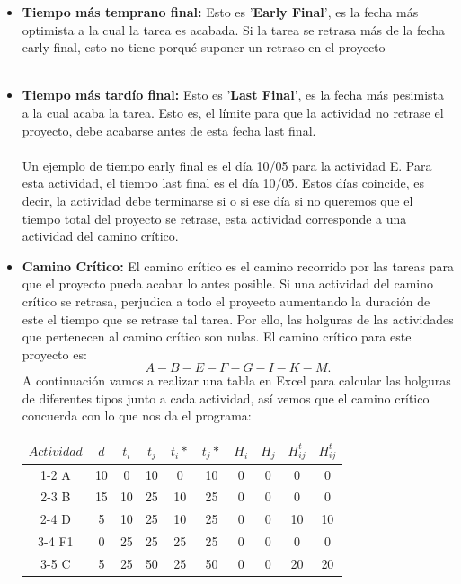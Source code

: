 \documentclass[11pt,letterpaper,onecolumn]{article}
\begin{document}
\begin{itemize}
    \item{\textbf{Tiempo más temprano final:}} Esto es '\textbf{Early Final}', es la fecha más optimista a la cual la tarea es acabada. Si la tarea se retrasa más de la fecha early final, esto no tiene porqué suponer un retraso en el proyecto\\
\\
    \item{\textbf{Tiempo más tardío final:}} Esto es '\textbf{Last Final}', es la fecha más pesimista a la cual acaba la tarea. Esto es, el límite para que la actividad no retrase el proyecto, debe acabarse antes de esta fecha last final. \\
\\
Un ejemplo de tiempo early final es el día 10/05 para la actividad E. Para esta actividad, el tiempo last final es el día 10/05. Estos días coincide, es decir, la actividad debe terminarse si o si ese día si no queremos que el tiempo total del proyecto se retrase, esta actividad corresponde a una actividad del camino crítico.
\\
\item{\textbf{Camino Crítico:}} El camino crítico es el camino recorrido por las tareas para que el proyecto pueda acabar lo antes posible. Si una actividad del camino crítico se retrasa, perjudica a todo el proyecto aumentando la duración de este el tiempo que se retrase tal tarea. Por ello, las holguras de las actividades que pertenecen al camino crítico son nulas. El camino crítico para este proyecto es:
    \[
    A-B-E-F-G-I-K-M
    .\] 
A continuación vamos a realizar una tabla en Excel para calcular las holguras de diferentes tipos junto a cada actividad, así vemos que el camino crítico concuerda con lo que nos da el programa:
\begin{table}[htbp]
    \centering
    \begin{tabular}{|c|ccccccccc|}
        \hline
        $Actividad$ & $d$ & $t_i$ & $t_j$ & $t_i*$ & $t_j*$ & $H_i$ & $H_j$ & $H^t_{ij}$ & $H_{ij}^t$ \\ \hline
        1-2 A & 10 & 0 & 10 & 0 & 10 & 0 & 0 & 0 & 0 \\ \hline
        2-3 B & 15 & 10 & 25 & 10 & 25 & 0 & 0 & 0 & 0 \\ \hline
        2-4 D & 5 & 10 & 25 & 10 & 25 & 0 & 0 & 10 & 10 \\ \hline
        3-4 F1 & 0 & 25 & 25 & 25 & 25 & 0 & 0 & 0 & 0 \\ \hline
        3-5 C & 5 & 25 & 50 & 25 & 50 & 0 & 0 & 20 & 20 \\ \hline

\end{tabular}
\end{table}
\end{itemize}
\end{document}
